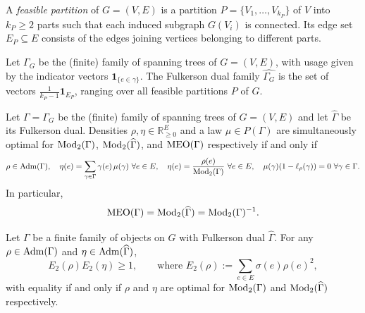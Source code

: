 \begin{definition}
\label{def:feasible-partition}
A \emph{feasible partition} of $G = (V, E)$ is a partition $P = \{V_1, \dots,
V_{k_P}\}$ of $V$ into $k_P \ge 2$ parts such that each induced subgraph
$G(V_i)$ is connected. Its edge set $E_P \subseteq E$ consists of the edges
joining vertices belonging to different parts.
\end{definition}

\begin{theorem}
\label{thm:spanning-tree-fulkerson-dual}
Let $\Gamma_G$ be the (finite) family of spanning trees of $G = (V, E)$, with
usage given by the indicator vectors $\mathbf 1_{\{e \in \gamma\}}$. The Fulkerson
dual family $\widehat{\Gamma_G}$ is the set of vectors $\frac{1}{k_P - 1}
\mathbf 1_{E_P}$, ranging over all feasible partitions $P$ of $G$.
\end{theorem}

\begin{theorem}
\label{thm:modulus-meo-feu}
Let $\Gamma = \Gamma_G$ be the (finite) family of spanning trees of $G = (V, E)$ and let
$\widehat\Gamma$ be its Fulkerson dual. Densities $\rho, \eta \in \mathbb
R_{\ge 0}^E$ and a law $\mu \in P(\Gamma)$ are simultaneously optimal for
$\operatorname{Mod}_2(\Gamma)$, $\operatorname{Mod}_2(\widehat\Gamma)$, and $\operatorname{MEO}(\Gamma)$ respectively if
and only if
\[
  \rho \in \operatorname{Adm}(\Gamma), \quad \eta(e) = \sum_{\gamma \in \Gamma} \gamma(e) \, \mu(\gamma) \ \forall e \in E, \quad
  \eta(e) = \frac{\rho(e)}{\operatorname{Mod}_2(\Gamma)} \ \forall e \in E, \quad
  \mu(\gamma) (1 - \ell_\rho(\gamma)) = 0 \ \forall \gamma \in \Gamma.
\]
In particular,
\[
  \operatorname{MEO}(\Gamma) = \operatorname{Mod}_2(\widehat\Gamma) = \operatorname{Mod}_2(\Gamma)^{-1}.
\]
\end{theorem}

\begin{corollary}
\label{cor:weak-duality}
Let $\Gamma$ be a finite family of objects on $G$ with Fulkerson dual
$\widehat\Gamma$. For any $\rho \in \operatorname{Adm}(\Gamma)$ and $\eta \in
\operatorname{Adm}(\widehat\Gamma)$,
\[
  E_2(\rho) E_2(\eta) \ge 1, \qquad \text{where } E_2(\rho) := \sum_{e \in E} \sigma(e) \rho(e)^2,
\]
with equality if and only if $\rho$ and $\eta$ are optimal for
$\operatorname{Mod}_2(\Gamma)$ and $\operatorname{Mod}_2(\widehat\Gamma)$ respectively.
\end{corollary}

